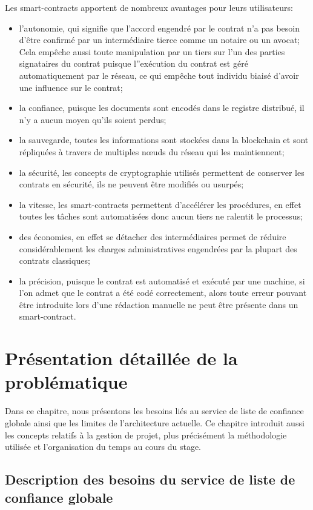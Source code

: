 \documentclass{tnreport}
\begin{document}
\clearpage
Les smart-contracts apportent de nombreux avantages pour leurs utilisateurs:
\begin{itemize}
	\item l'autonomie, qui signifie que l'accord engendré par le contrat n'a pas besoin d'être confirmé par un intermédiaire tierce comme un notaire ou un avocat; Cela empêche aussi toute manipulation par un tiers sur l'un des parties signataires du contrat puisque l''exécution du contrat est géré automatiquement par le réseau, ce qui empêche tout individu biaisé d'avoir une influence sur le contrat;
	\item la confiance, puisque les documents sont encodés dans le registre distribué, il n'y a aucun moyen qu'ils soient perdus;
	\item la sauvegarde, toutes les informations sont stockées dans la blockchain et sont répliquées à travers de multiples nœuds du réseau qui les maintiennent;
	\item la sécurité, les concepts de cryptographie utilisés permettent de conserver les contrats en sécurité, ils ne peuvent être modifiés ou usurpés;
	\item la vitesse, les smart-contracts permettent d'accélérer les procédures, en effet toutes les tâches sont automatisées donc aucun tiers ne ralentit le processus;
	\item des économies, en effet se détacher des intermédiaires permet de réduire considérablement les charges administratives engendrées par la plupart des contrats classiques;
	\item la précision, puisque le contrat est automatisé et exécuté par une machine, si l'on admet que le contrat a été codé correctement, alors toute erreur pouvant être introduite lors d'une rédaction manuelle ne peut être présente dans un smart-contract.
\end{itemize}

\chapter{Présentation détaillée de la problématique}

Dans ce chapitre, nous présentons les besoins liés au service de liste de confiance globale ainsi que les limites de l'architecture actuelle. Ce chapitre introduit aussi les concepts relatifs à la gestion de projet, plus précisément la méthodologie utilisée et l'organisation du temps au cours du stage.

\section{Description des besoins du service de liste de confiance globale}
\label{sec:description}
\end{document}
